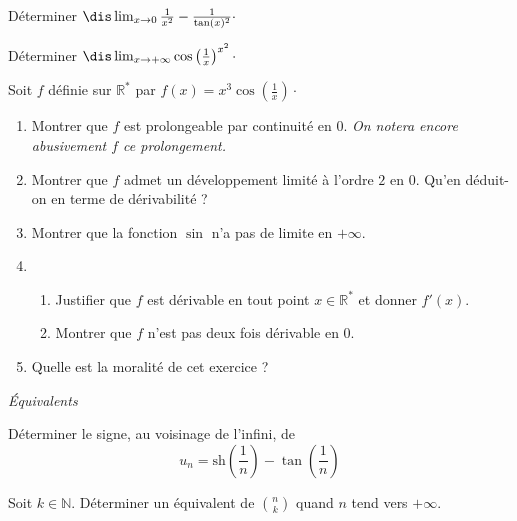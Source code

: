 \documentclass[a4paper,10pt]{report}
\begin{document}
\begin{Exa} Déterminer $\dis \lim_{x \rightarrow 0} \frac{1}{x^2} - \frac{1}{\tan(x)^2} \cdot$
\end{Exa} 



\begin{Exa} Déterminer $\dis \lim_{x \rightarrow + \infty}  \cos \left( \frac{1}{x} \right)^{x^2} \cdot$
\end{Exa}



\begin{Exa}[\ding{80}] Soit $f$ définie sur $\mathbb{R}^*$ par $f(x) = x^3 \cos \left( \frac{1}{x} \right) \cdot$

\begin{enumerate}
\item Montrer que $f$ est prolongeable par continuité en $0$. \textit{On notera encore abusivement $f$ ce prolongement.}
\item Montrer que $f$ admet un développement limité à l'ordre $2$ en $0$. Qu'en déduit-on en terme de dérivabilité ?
\item Montrer que la fonction $\sin$ n'a pas de limite en $+ \infty$. 
\item 
\begin{enumerate}
\item Justifier que $f$ est dérivable en tout point $x \in \mathbb{R}^*$ et donner $f'(x)$.
\item Montrer que $f$ n'est pas deux fois dérivable en $0$.
\end{enumerate}
\item Quelle est la moralité de cet exercice ?
\end{enumerate}
\end{Exa} 



\medskip

\begin{center}
\textit{{ {\large Équivalents}}}
\end{center}

\medskip


\begin{Exa} D\'{e}terminer le signe, au voisinage de l'infini, de 
$$u_{n}=\text{sh}\left( \dfrac{1}{n}\right) -\tan \left( \dfrac{1}{n}\right)$$
\end{Exa}




\begin{Exa} Soit $k \in \mathbb{N}$. Déterminer un équivalent de $\binom{n}{k}$ quand $n$ tend vers $+ \infty$. 
\end{Exa}
\end{document}
